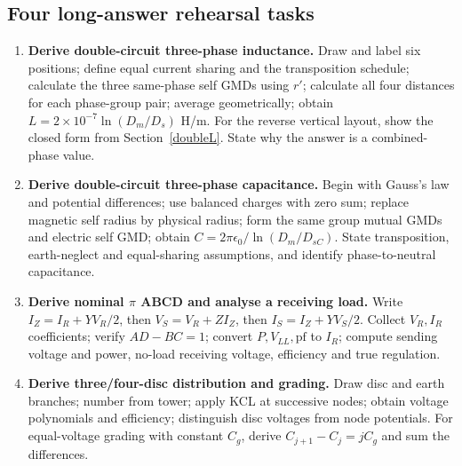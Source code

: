 \documentclass[11pt,a4paper]{article}
\begin{document}
\subsection{Four long-answer rehearsal tasks}
\begin{enumerate}
\item \textbf{Derive double-circuit three-phase inductance.} Draw and label six positions; define equal current sharing and the transposition schedule; calculate the three same-phase self GMDs using $r'$; calculate all four distances for each phase-group pair; average geometrically; obtain $L=2\times10^{-7}\ln(D_m/D_s)$ H/m. For the reverse vertical layout, show the closed form from Section~\ref{doubleL}. State why the answer is a combined-phase value.
\item \textbf{Derive double-circuit three-phase capacitance.} Begin with Gauss's law and potential differences; use balanced charges with zero sum; replace magnetic self radius by physical radius; form the same group mutual GMDs and electric self GMD; obtain $C=2\pi\epsilon_0/\ln(D_m/D_{sC})$. State transposition, earth-neglect and equal-sharing assumptions, and identify phase-to-neutral capacitance.
\item \textbf{Derive nominal $\pi$ ABCD and analyse a receiving load.} Write $I_Z=I_R+YV_R/2$, then $V_S=V_R+ZI_Z$, then $I_S=I_Z+YV_S/2$. Collect $V_R,I_R$ coefficients; verify $AD-BC=1$; convert $P,V_{LL},\mathrm{pf}$ to $I_R$; compute sending voltage and power, no-load receiving voltage, efficiency and true regulation.
\item \textbf{Derive three/four-disc distribution and grading.} Draw disc and earth branches; number from tower; apply KCL at successive nodes; obtain voltage polynomials and efficiency; distinguish disc voltages from node potentials. For equal-voltage grading with constant $C_g$, derive $C_{j+1}-C_j=jC_g$ and sum the differences.
\end{enumerate}
\end{document}
